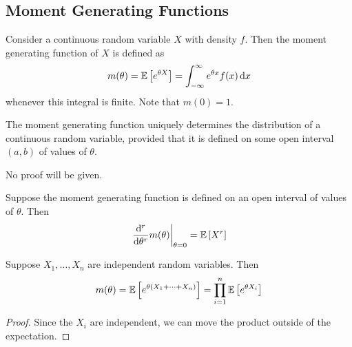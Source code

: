 \subsection{Moment Generating Functions}
Consider a continuous random variable $X$ with density $f$. Then the moment generating function of $X$ is defined as
\[ m(\theta) = \mathbb{E}\left[{e^{\theta X}}\right] = \int_{-\infty}^\infty e^{\theta x} f(x) \dd{x} \]
whenever this integral is finite. Note that $m(0) = 1$.
\begin{theorem}
	The moment generating function uniquely determines the distribution of a continuous random variable, provided that it is defined on some open interval $(a, b)$ of values of $\theta$.
\end{theorem}
\noindent No proof will be given.
\begin{theorem}
	Suppose the moment generating function is defined on an open interval of values of $\theta$. Then
	\[ \eval{\dv[r]{\theta}m(\theta)}_{\theta = 0} = \expect{X^r} \]
\end{theorem}
\begin{theorem}
	Suppose $X_1, \dots, X_n$ are independent random variables. Then
	\[ m(\theta) = \mathbb{E}\left[{e^{\theta(X_1 + \dots + X_n)}}\right] = \prod_{i=1}^n \mathbb{E}\left[{e^{\theta X_i}}\right] \]
\end{theorem}
\begin{proof}
	Since the $X_i$ are independent, we can move the product outside of the expectation.
\end{proof}

